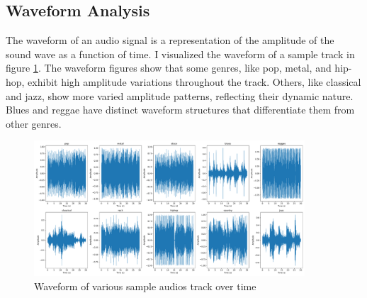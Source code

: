 \documentclass[11.5pt]{article}
\begin{document}
\subsection{Waveform Analysis}
The waveform of an audio signal is a representation of the amplitude of the sound wave as a function of time. I visualized the waveform of a sample track in figure \ref{fig:waveform}. The waveform figures show that some genres, like pop, metal, and hip-hop, exhibit high amplitude variations throughout the track. Others, like classical and jazz, show more varied amplitude patterns, reflecting their dynamic nature. Blues and reggae have distinct waveform structures that differentiate them from other genres.
\begin{figure}[H]
    \centering
    \includegraphics[width=0.9\textwidth]{graphics/waveform.pdf}
    \caption{Waveform of various sample audios track over time}
    \label{fig:waveform}
\end{figure}
\end{document}
